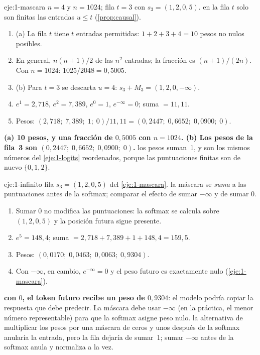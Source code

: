 \begin{solucion}{eje:1-mascara}
\datos $n=4$ y $n=1024$; fila $t=3$ con $s_3=(1,2,0,5)$.
\planteamiento en la fila $t$ solo son finitas las entradas $u\le t$ (\cref{prop:causal}).
\pasos
\begin{enumerate}[label=\arabic*.]
  \item (a) La fila $t$ tiene $t$ entradas permitidas: $1+2+3+4=10$ pesos no nulos posibles.
  \item En general, $n(n+1)/2$ de las $n^{2}$ entradas; la fracción es $(n+1)/(2n)$. Con $n=1024$: $1025/2048=0{,}5005$.
  \item (b) Para $t=3$ se descarta $u=4$: $s_3+M_3=(1,2,0,-\infty)$.
  \item $e^{1}=2{,}718$, $e^{2}=7{,}389$, $e^{0}=1$, $e^{-\infty}=0$; suma $=11{,}11$.
  \item Pesos: $(2{,}718;\;7{,}389;\;1;\;0)/11{,}11=(0{,}2447;\;0{,}6652;\;0{,}0900;\;0)$.
\end{enumerate}
\resultado \textbf{(a) 10 pesos, y una fracción de $0{,}5005$ con $n=1024$. (b) Los pesos de la fila~3 son $(0{,}2447;\;0{,}6652;\;0{,}0900;\;0)$.}
\comprobacion los pesos suman~1, y son los mismos números del \cref{eje:1-logits} reordenados, porque las puntuaciones finitas son de nuevo $\{0,1,2\}$.
\end{solucion}

\begin{solucion}{eje:1-infinito}
\datos fila $s_3=(1,2,0,5)$ del \cref{eje:1-mascara}.
\planteamiento la máscara se \emph{suma} a las puntuaciones antes de la softmax; comparar el efecto de sumar $-\infty$ y de sumar $0$.
\pasos
\begin{enumerate}[label=\arabic*.]
  \item Sumar $0$ no modifica las puntuaciones: la softmax se calcula sobre $(1,2,0,5)$ y la posición futura sigue presente.
  \item $e^{5}=148{,}4$; suma $=2{,}718+7{,}389+1+148{,}4=159{,}5$.
  \item Pesos: $(0{,}0170;\;0{,}0463;\;0{,}0063;\;0{,}9304)$.
  \item Con $-\infty$, en cambio, $e^{-\infty}=0$ y el peso futuro es exactamente nulo (\cref{eje:1-mascara}).
\end{enumerate}
\resultado \textbf{con $0$, el token futuro recibe un peso de $0{,}9304$}: el modelo podría copiar la respuesta que debe predecir. La máscara debe usar $-\infty$ (en la práctica, el menor número representable) para que la softmax asigne peso nulo.
\comprobacion la alternativa de multiplicar los pesos por una máscara de ceros y unos después de la softmax anularía la entrada, pero la fila dejaría de sumar~1; sumar $-\infty$ antes de la softmax anula y normaliza a la vez.
\end{solucion}

